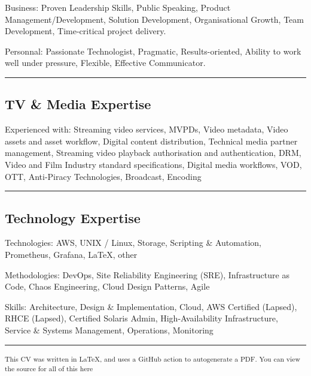 \documentclass[10pt,a4paper]{article}
\newenvironment{indentsection}[1]%
{\begin{list}{}%
	{\setlength{\leftmargin}{#1}}%
	\item[]%
}
{\end{list}}
\begin{document}
\begin{indentsection}{\parindent}
\begin{description*}
		\item[Business:]
		Proven Leadership Skills, Public Speaking, Product Management/Development, Solution Development, Organisational Growth, Team Development, Time-critical project delivery.
    \item[Personnal:]
		Passionate Technologist, Pragmatic, Results-oriented, Ability to work well under pressure, Flexible, Effective Communicator.
\end{description*}
\end{indentsection}

\hrule
\vspace{-0.4em}
\subsection*{TV \& Media Expertise}

\begin{indentsection}{\parindent}
\begin{description*}
	\item[Experienced with:]
	Streaming video services, MVPDs, Video metadata, Video assets and asset workflow, Digital content distribution, Technical media partner management, Streaming video playback authorisation and authentication, DRM, Video and Film Industry standard specifications, Digital media workflows, VOD, OTT, Anti-Piracy Technologies, Broadcast, Encoding

\end{description*}
\end{indentsection}

\hrule
\vspace{-0.4em}
\subsection*{Technology Expertise}

\begin{indentsection}{\parindent}
\begin{description*}
	\item[Technologies:]
	AWS, UNIX / Linux, Storage, Scripting \& Automation, Prometheus, Grafana, \LaTeX, other
	\item[Methodologies:]
	DevOps, Site Reliability Engineering (SRE), Infrastructure as Code, Chaos Engineering, Cloud Design Patterns, Agile
	\item[Skills:]
	Architecture, Design \& Implementation, Cloud, AWS Certified (Lapsed), RHCE (Lapsed), Certified Solaris Admin, High-Availability Infrastructure, Service \& Systems Management, Operations, Monitoring
\end{description*}
\end{indentsection}


\hrule
\vspace{-0.4em}

\begin{description*}
	\item
	\textsubscript{This CV was written in \LaTeX, and uses a GitHub action to autogenerate a PDF.  You can view the source for all of this here}

\end{description*}
\end{document}
